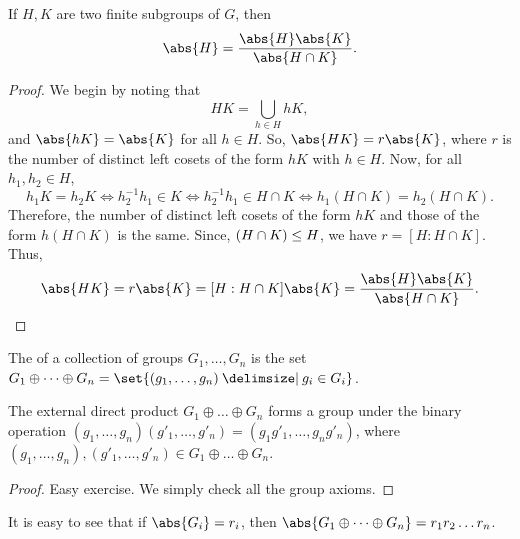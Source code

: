 \documentclass[11pt]{penrose}
\begin{document}
\begin{nthm}
    If $H, K$ are two finite subgroups of $G$, then
    \begin{equation*}
        \abs{H} = \frac{\abs{H} \abs{K}}{\abs{H \cap K}}.
    \end{equation*}
\end{nthm}
\begin{proof}
    We begin by noting that
    \begin{equation*}
        HK = \bigcup_{h \in H} hK,
    \end{equation*}
    and $\abs{hK} = \abs{K}$ for all $h \in H$. So, $\abs{HK} = r \abs{K}$, where $r$ is the number of distinct left cosets of the form $hK$ with $h \in H$. Now, for all $h_{1}, h_{2} \in H$,
    \begin{equation*}
        h_{1} K = h_{2} K
        \iff h_{2}^{-1} h_{1} \in K
        \iff h_{2}^{-1} h_{1} \in H \cap K
        \iff h_{1} (H \cap K) = h_{2} (H \cap K).
    \end{equation*}
    Therefore, the number of distinct left cosets of the form $hK$ and those of the form $h (H \cap K)$ is the same. Since, $(H \cap K) \mathrel{\leq} H$, we have $r = [H : H \cap K]$. Thus,
    \begin{equation*}
        \abs{HK} = r \abs{K} = [H : H \cap K] \abs{K} = \frac{\abs{H}\abs{K}}{\abs{H \cap K}}.
        \qedhere
    \end{equation*}
\end{proof}

\begin{ndfn}
    The  of a collection of groups $G_{1}, \dots, G_{n}$ is the set $G_{1} \oplus \dots \oplus G_{n} = \set{ (g_{1}, \dots, g_{n}) \st g_{i} \in G_{i} }$.
\end{ndfn}

\begin{nthm}
    The external direct product $G_{1} \oplus \dots \oplus G_{n}$ forms a group under the binary operation $(g_{1}, \dots, g_{n}) (g'_{1}, \dots, g'_{n}) = (g_{1}g'_{1}, \dots, g_{n}g'_{n})$,
    where $(g_{1}, \dots, g_{n}), (g'_{1}, \dots, g'_{n}) \in G_{1} \oplus \dots \oplus G_{n}$.
\end{nthm}
\begin{proof}
    Easy exercise. We simply check all the group axioms.
\end{proof}

\begin{remark}
    It is easy to see that if $\abs{G_{i}} = r_{i}$, then $\abs{ G_{1} \oplus \dots \oplus G_{n} } = r_{1} r_{2} \dots r_{n}$.
\end{remark}
\end{document}
